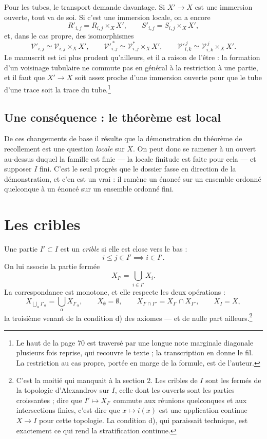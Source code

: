 \documentclass[11pt,a4paper]{article}
\begin{document}
Pour les tubes, le transport demande davantage. Si $X' \to X$ est une immersion
ouverte, tout va de soi. Si c'est une immersion locale, on a encore
\[
  R'_{i,j} = R_{i,j} \times_{X} X', \qquad S'_{i,j} = S_{i,j} \times_{X} X',
\]
et, dans le cas propre, des isomorphismes
\[
  \mathcal{V}'_{i,j} \simeq \mathcal{V}_{i,j} \times_{X} X',
  \qquad
  \mathcal{V}'^{\,*}_{i,j} \simeq \mathcal{V}^{*}_{i,j} \times_{X} X',
  \qquad
  \mathcal{V}'^{\,j}_{i,k} \simeq \mathcal{V}^{\,j}_{i,k} \times_{X} X'.
\]
Le manuscrit est ici plus prudent qu'ailleurs, et il a raison de l'être : la
formation d'un voisinage tubulaire ne commute pas en général à la restriction à
une partie, et il faut que $X' \to X$ soit assez proche d'une immersion ouverte
pour que le tube d'une trace soit la trace du tube.\footnote{Le haut de la page
70 est traversé par une longue note marginale diagonale plusieurs fois reprise,
qui recouvre le texte ; la transcription en donne le fil. La restriction au cas
propre, portée en marge de la formule, est de l'auteur.}

\subsection*{Une conséquence : le théorème est local}

De ces changements de base il résulte que la démonstration du théorème de
recollement est une question \emph{locale} sur $X$. On peut donc se ramener à un
ouvert au-dessus duquel la famille est finie — la locale finitude est faite pour
cela — et supposer $I$ fini. C'est le seul progrès que le dossier fasse en
direction de la démonstration, et c'en est un vrai : il ramène un énoncé sur un
ensemble ordonné quelconque à un énoncé sur un ensemble ordonné fini.

\section*{Les cribles}

Une partie $I' \subset I$ est un \emph{crible} si elle est close vers le bas :
\[
  i \leq j \in I' \implies i \in I'.
\]
On lui associe la partie fermée
\[
  X_{I'} = \bigcup_{i \in I'} X_{i}.
\]
La correspondance est monotone, et elle respecte les deux opérations :
\[
  X_{\bigcup_{\alpha} I'_{\alpha}} = \bigcup_{\alpha} X_{I'_{\alpha}},
  \qquad X_{\emptyset} = \emptyset,
  \qquad
  X_{I' \cap I''} = X_{I'} \cap X_{I''}, \qquad X_{I} = X,
\]
la troisième venant de la condition d) des axiomes — et de nulle part
ailleurs.\footnote{C'est la moitié qui manquait à la section 2. Les cribles de
$I$ sont les fermés de la topologie d'Alexandrov sur $I$, celle dont les ouverts
sont les parties croissantes ; dire que $I' \mapsto X_{I'}$ commute aux réunions
quelconques et aux intersections finies, c'est dire que $x \mapsto i(x)$ est une
application continue $X \to I$ pour cette topologie. La condition d), qui
paraissait technique, est exactement ce qui rend la stratification continue.}
\end{document}
